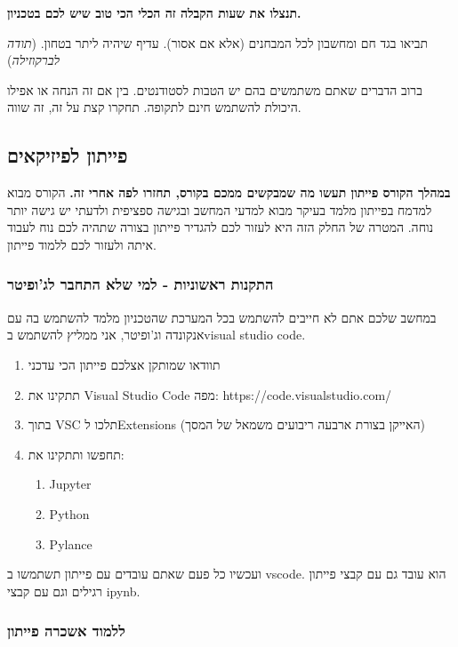 \documentclass[a4paper,12pt]{article}
\begin{document}
\textbf{תנצלו את שעות הקבלה זה הכלי הכי טוב שיש לכם בטכניון.}

תביאו בגד חם ומחשבון לכל המבחנים (אלא אם אסור). עדיף שיהיה ליתר בטחון. (\emph{תודה לברקוזילה})

ברוב הדברים שאתם משתמשים בהם יש הטבות לסטודנטים. בין אם זה הנחה או אפילו היכולת להשתמש חינם לתקופה. תחקרו קצת על זה, זה שווה.

\subsection{פייתון לפיזיקאים}\label{pythonlearn}

\textbf{במהלך הקורס פייתון תעשו מה שמבקשים ממכם בקורס, תחזרו לפה אחרי זה.} הקורס מבוא למדמח בפייתון מלמד בעיקר מבוא למדעי המחשב ובגישה ספציפית ולדעתי יש גישה יותר נוחה. המטרה של החלק הזה היא לעזור לכם להגדיר פייתון בצורה שתהיה לכם נוח לעבוד איתה ולעזור לכם ללמוד פייתון. 

\subsubsection{התקנות ראשוניות - למי שלא התחבר לג'ופיטר}

במחשב שלכם אתם לא חייבים להשתמש בכל המערכת שהטכניון מלמד להשתמש בה עם אנקונדה וג'ופיטר, אני ממליץ להשתמש ב\textenglish{visual studio code}.

\begin{enumerate}
    \item תוודאו שמותקן אצלכם פייתון הכי עדכני
    \item תתקינו את \textenglish{Visual Studio Code} מפה: https://code.visualstudio.com/
    \item בתוך \textenglish{VSC} תלכו ל\textenglish{Extensions} (האייקן בצורת ארבעה ריבועים משמאל של המסך)
    \item תחפשו ותתקינו את: \begin{enumerate}
        \item \textenglish{Jupyter}
        \item \textenglish{Python}
        \item \textenglish{Pylance}
    \end{enumerate}
\end{enumerate}

ועכשיו כל פעם שאתם עובדים עם פייתון תשתמשו ב \textenglish{vscode}. הוא עובד גם עם קבצי פייתון רגילים וגם עם קבצי \textenglish{ipynb}.

\subsubsection{ללמוד אשכרה פייתון}
\end{document}
